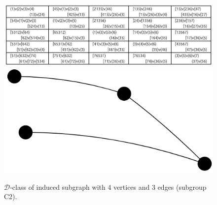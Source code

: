 \begin{appendices}
\begin{figure}[H]
\includegraphics[scale=0.2]{images/x9/x9_4v_3e_2.png}
\includegraphics[scale=0.1]{images/x9/x9_4v_3e_2_vis.png}
\caption{$\mathcal{D}$-class of induced subgraph with 4 vertices and 3 edges (subgroup C2).}
\end{figure}


\end{appendices}
